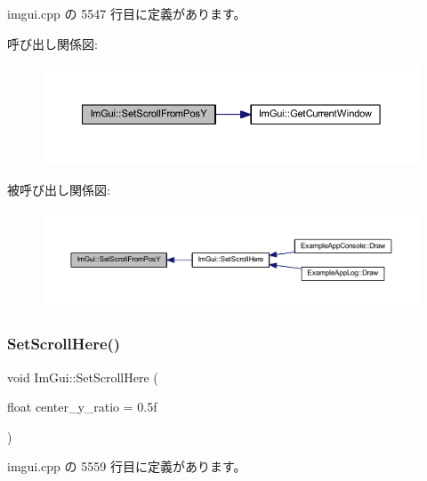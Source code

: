  imgui.\+cpp の 5547 行目に定義があります。

呼び出し関係図\+:\nopagebreak
\begin{figure}[H]
\begin{center}
\leavevmode
\includegraphics[width=350pt]{namespace_im_gui_a57d8e9497ad39584ba740cef70b78fb4_cgraph}
\end{center}
\end{figure}
被呼び出し関係図\+:\nopagebreak
\begin{figure}[H]
\begin{center}
\leavevmode
\includegraphics[width=350pt]{namespace_im_gui_a57d8e9497ad39584ba740cef70b78fb4_icgraph}
\end{center}
\end{figure}
\mbox{\label{namespace_im_gui_aa60ea4a42b8d03d27431f8e79b9f0254}} 
\subsubsection{\texorpdfstring{Set\+Scroll\+Here()}{SetScrollHere()}}
{\footnotesize\ttfamily void Im\+Gui\+::\+Set\+Scroll\+Here (\begin{DoxyParamCaption}\item[{float}]{center\+\_\+y\+\_\+ratio = {\ttfamily 0.5f} }\end{DoxyParamCaption})}



 imgui.\+cpp の 5559 行目に定義があります。


